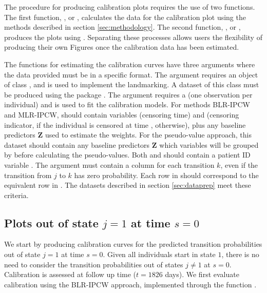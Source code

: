 \documentclass[article,shortnames]{jss}
\begin{document}
The procedure for producing calibration plots requires the use of two functions. The first function, ,  or , calculates the data for the calibration plot using the methods described in section \ref{sec:methodology}. The second function, ,  or , produces the plots using . Separating these processes allows users the flexibility of producing their own Figures once the calibration data has been estimated.

The functions for estimating the calibration curves have three arguments where the data provided must be in a specific format. The  argument requires an object of class , and is used to implement the landmarking. A dataset of this class must be produced using the package  \citep{DeWreede2011}. The  argument requires a  (one observation per individual) and is used to fit the calibration models. For methods BLR-IPCW and MLR-IPCW,  should contain variables  (censoring time) and  (censoring indicator,  if the individual is censored at time ,  otherwise), plus any baseline predictors $\textbf{Z}$ used to estimate the weights. For the pseudo-value approach, this dataset should contain any baseline predictors $\textbf{Z}$ which variables will be grouped by before calculating the pseudo-values. Both  and  should contain a patient ID variable . The  argument must contain a column for each transition $k$, even if the transition from $j$ to $k$ has zero probability. Each row in  should correspond to the equivalent row in . The datasets described in section \ref{sec:dataprep} meet these criteria.

\subsection[Plots out of states j = 1 at time s = 0]{Plots out of state $j = 1$ at time $s = 0$} \label{sec:plotsj1s0}

We start by producing calibration curves for the predicted transition probabilities out of state $j = 1$ at time $s = 0$. Given all individuals start in state $1$, there is no need to consider the transition probabilities out of states $j \neq 1$ at $s = 0$. Calibration is assessed at follow up time ($t = 1826$ days). We first evaluate calibration using the BLR-IPCW approach, implemented through the function .
\end{document}

